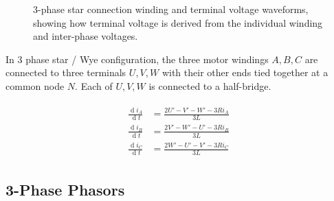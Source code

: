 \documentclass[12pt,a4paper,oneside,openany]{article}
\DeclareMathOperator{\ud}{d}
\begin{document}
\begin{figure}[htbp]
\begin{center}

\caption[Star Waveforms]{3-phase star connection winding and terminal voltage waveforms, showing how terminal voltage is derived from the individual winding and inter-phase voltages.}
\label{fig:waveform3}
\end{center}
\end{figure}

In 3 phase star / Wye configuration, the three motor windings $A,B,C$ are connected to three terminals $U,V,W$ with their other ends tied together at a common node $N$. Each of $U,V,W$ is connected to a half-bridge.


\begin{gather}
\begin{aligned}
\frac{\ud i_A}{\ud t} &= \frac{2 U' - V' - W' - 3 R i_A}{3 L} \\
\frac{\ud i_B}{\ud t} &= \frac{2 V' - W' - U' - 3 R i_B}{3 L} \\
\frac{\ud i_C}{\ud t} &= \frac{2 W' - U' - V' - 3 R i_C}{3 L}
\end{aligned}
\end{gather}


\subsection{3-Phase Phasors}
\end{document}
